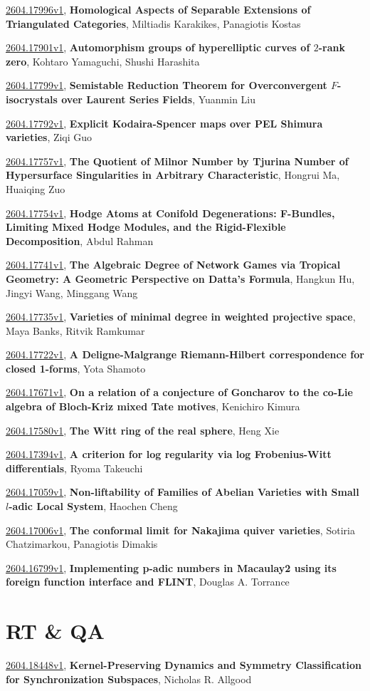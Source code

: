 \documentclass[9pt, a4paper]{article}
\theoremstyle{plain}
\theoremstyle{definition}
\theoremstyle{remark}
\newcommand{\arxiv}[3]{\href{https://arxiv.org/abs/#1}{#1}, \textbf{\textcolor{arxivblue}{#2}}, #3}
\begin{document}
\arxiv{2604.17996v1}{Homological Aspects of Separable Extensions of Triangulated Categories}{Miltiadis Karakikes, Panagiotis Kostas}

\arxiv{2604.17901v1}{Automorphism groups of hyperelliptic curves of $2$-rank zero}{Kohtaro Yamaguchi, Shushi Harashita}

\arxiv{2604.17799v1}{Semistable Reduction Theorem for Overconvergent $F$-isocrystals over Laurent Series Fields}{Yuanmin Liu}

\arxiv{2604.17792v1}{Explicit Kodaira-Spencer maps over PEL Shimura varieties}{Ziqi Guo}

\arxiv{2604.17757v1}{The Quotient of Milnor Number by Tjurina Number of Hypersurface Singularities in Arbitrary Characteristic}{Hongrui Ma, Huaiqing Zuo}

\arxiv{2604.17754v1}{Hodge Atoms at Conifold Degenerations: F-Bundles, Limiting Mixed Hodge Modules, and the Rigid-Flexible Decomposition}{Abdul Rahman}

\arxiv{2604.17741v1}{The Algebraic Degree of Network Games via Tropical Geometry: A Geometric Perspective on Datta's Formula}{Hangkun Hu, Jingyi Wang, Minggang Wang}

\arxiv{2604.17735v1}{Varieties of minimal degree in weighted projective space}{Maya Banks, Ritvik Ramkumar}

\arxiv{2604.17722v1}{A Deligne-Malgrange Riemann-Hilbert correspondence for closed 1-forms}{Yota Shamoto}

\arxiv{2604.17671v1}{On a relation of a conjecture of Goncharov to the co-Lie algebra of Bloch-Kriz mixed Tate motives}{Kenichiro Kimura}

\arxiv{2604.17580v1}{The Witt ring of the real sphere}{Heng Xie}

\arxiv{2604.17394v1}{A criterion for log regularity via log Frobenius-Witt differentials}{Ryoma Takeuchi}

\arxiv{2604.17059v1}{Non-liftability of Families of Abelian Varieties with Small $l$-adic Local System}{Haochen Cheng}

\arxiv{2604.17006v1}{The conformal limit for Nakajima quiver varieties}{Sotiria Chatzimarkou, Panagiotis Dimakis}

\arxiv{2604.16799v1}{Implementing p-adic numbers in Macaulay2 using its foreign function interface and FLINT}{Douglas A. Torrance}


\section{RT \& QA}
\arxiv{2604.18448v1}{Kernel-Preserving Dynamics and Symmetry Classification for Synchronization Subspaces}{Nicholas R. Allgood}
\end{document}

